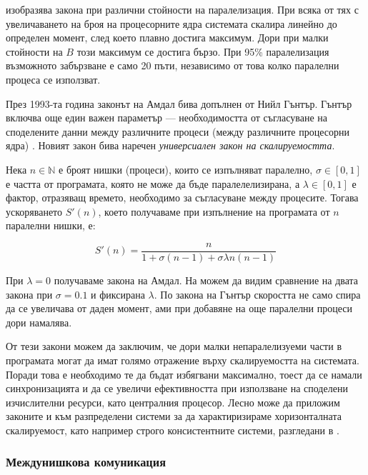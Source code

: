  изобразява закона при различни стойности на паралелизация. При всяка от тях с увеличаването на броя на процесорните ядра системата скалира линейно до определен момент, след което плавно достига максимум. Дори при малки стойности на $B$ този максимум се достига бързо. При 95\% паралелизация възможното забързване е само 20 пъти, независимо от това колко паралелни процеса се използват.

През 1993-та година законът на Амдал бива допълнен от Нийл Гънтър. Гънтър включва още един важен параметър — необходимостта от съгласуване на споделените данни между различните процеси (между различните процесорни ядра) \cite{gunther1993Law}. Новият закон бива наречен \emph{универсиален закон на скалируемостта}.

Нека $n \in \mathbb{N}$ е броят нишки (процеси), които се изпълняват паралелно, $\sigma \in [0, 1]$ е частта от програмата, която не може да бъде паралелелизирана, а $\lambda \in [0, 1]$ е фактор, отразяващ времето, необходимо за съгласуване между процесите. Тогава ускоряването $S'(n)$, което получаваме при изпълнение на програмата от $n$ паралелни нишки, е:

\begin{equation}
S'(n) = \frac{n}{1 + \sigma(n - 1) + \sigma\lambda{n}(n - 1)}
\end{equation}

При $\lambda = 0$ получаваме закона на Амдал. На  можем да видим сравнение на двата закона при $\sigma = 0.1$ и фиксирана $\lambda$. По закона на Гънтър скоростта не само спира да се увеличава от даден момент, ами при добавяне на още паралелни процеси дори намалява.

От тези закони можем да заключим, че дори малки непаралелизуеми части в програмата могат да имат голямо отражение върху скалируемостта на системата. Поради това е необходимо те да бъдат избягвани максимално, тоест да се намали синхронизацията и да се увеличи ефективността при използване на споделени изчислителни ресурси, като централния процесор. Лесно може да приложим законите и към разпределени системи за да характиризираме хоризонталната скалируемост, като например строго консистентните системи, разгледани в .

\subsubsection{Междунишкова комуникация}

